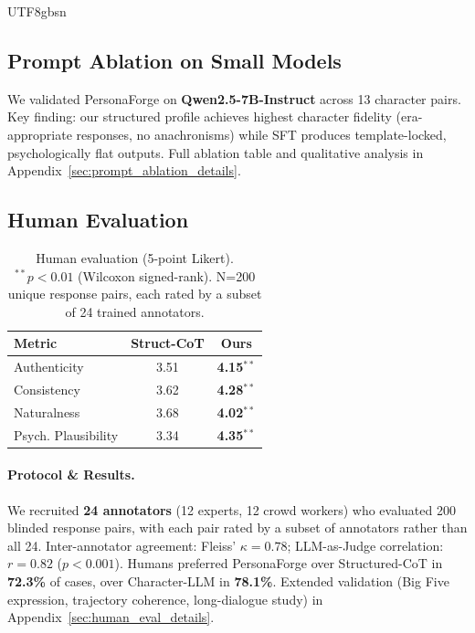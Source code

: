 \documentclass[11pt]{article}
\begin{document}
\begin{CJK*}{UTF8}{gbsn}
\subsection{Prompt Ablation on Small Models}
\label{sec:prompt_ablation}

We validated PersonaForge on \textbf{Qwen2.5-7B-Instruct} across 13 character pairs. Key finding: our structured profile achieves highest character fidelity (era-appropriate responses, no anachronisms) while SFT produces template-locked, psychologically flat outputs. Full ablation table and qualitative analysis in Appendix~\ref{sec:prompt_ablation_details}.

\subsection{Human Evaluation}
\label{sec:human_eval}

\begin{table}[t]
\centering
\small
\begin{tabular}{lcc}
\toprule
\textbf{Metric} & \textbf{Struct-CoT} & \textbf{Ours} \\
\midrule
Authenticity & 3.51 & \textbf{4.15}$^{**}$ \\
Consistency & 3.62 & \textbf{4.28}$^{**}$ \\
Naturalness & 3.68 & \textbf{4.02}$^{**}$ \\
Psych. Plausibility & 3.34 & \textbf{4.35}$^{**}$ \\
\bottomrule
\end{tabular}
\caption{Human evaluation (5-point Likert). $^{**}p < 0.01$ (Wilcoxon signed-rank). N=200 unique response pairs, each rated by a subset of 24 trained annotators.}
\label{tab:human}
\end{table}

\paragraph{Protocol \& Results.} We recruited \textbf{24 annotators} (12 experts, 12 crowd workers) who evaluated 200 blinded response pairs, with each pair rated by a subset of annotators rather than all 24. Inter-annotator agreement: Fleiss' $\kappa = 0.78$; LLM-as-Judge correlation: $r=0.82$ ($p < 0.001$). Humans preferred PersonaForge over Structured-CoT in \textbf{72.3\%} of cases, over Character-LLM in \textbf{78.1\%}. Extended validation (Big Five expression, trajectory coherence, long-dialogue study) in Appendix~\ref{sec:human_eval_details}.


\end{CJK*}
\end{document}
